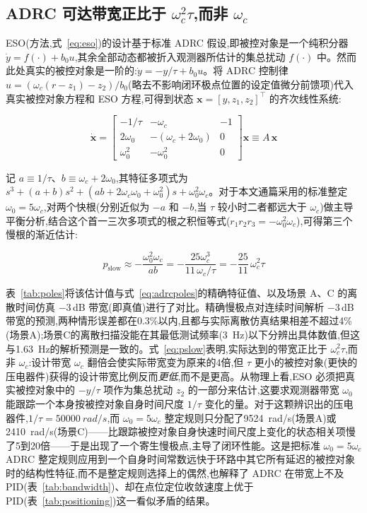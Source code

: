 \documentclass[fleqn,10pt]{wlscirep}
\begin{document}
\subsection*{ADRC 可达带宽正比于 $\omega_c^2\tau$,而非 $\omega_c$}

ESO(方法,式~\ref{eq:eso})的设计基于标准 ADRC 假设,即被控对象是一个纯积分器 $\dot{y} = f(\cdot) + b_0 u$,其余全部动态都被折入观测器所估计的集总扰动 $f(\cdot)$ 中。然而此处真实的被控对象是一阶的:$\dot{y} = -y/\tau + b_0 u$。将 ADRC 控制律 $u = (\omega_c(r-z_1) - z_2)/b_0$(略去不影响闭环极点位置的设定值微分前馈项)代入真实被控对象方程和 ESO 方程,可得到状态 $\mathbf{x} = [y, z_1, z_2]^\top$ 的齐次线性系统:

\begin{equation}
\dot{\mathbf{x}} = \begin{bmatrix} -1/\tau & -\omega_c & -1 \\ 2\omega_0 & -(\omega_c+2\omega_0) & 0 \\ \omega_0^2 & -\omega_0^2 & 0 \end{bmatrix}\mathbf{x} \equiv A\,\mathbf{x}
\label{eq:adrcpoles}
\end{equation}

记 $a \equiv 1/\tau$、$b \equiv \omega_c + 2\omega_0$,其特征多项式为 $s^3 + (a+b)s^2 + (ab+2\omega_c\omega_0+\omega_0^2)s + \omega_0^2\omega_c$。对于本文通篇采用的标准整定 $\omega_0 = 5\omega_c$,对两个快根(分别近似为 $-a$ 和 $-b$,当 $\tau$ 较小时二者都远大于 $\omega_c$)做主导平衡分析,结合这个首一三次多项式的根之积恒等式($r_1 r_2 r_3 = -\omega_0^2\omega_c$),可得第三个慢根的渐近估计:

\begin{equation}
p_\text{slow} \approx -\frac{\omega_0^2\omega_c}{ab} = -\frac{25\omega_c^3}{11\,\omega_c/\tau} = -\frac{25}{11}\,\omega_c^2\tau
\label{eq:pslow}
\end{equation}

表~\ref{tab:poles}将该估计值与式~\ref{eq:adrcpoles}的精确特征值、以及场景 A、C 的离散时间仿真 $-3$\,dB 带宽(即真值)进行了对比。精确慢极点对连续时间解析 $-3$\,dB 带宽的预测,两种情形误差都在0.3\%以内,且都与实际离散仿真结果相差不超过4\%(场景A);场景C的离散扫描没能在其最低测试频率(\SI{3}{Hz})以下分辨出具体数值,但这与\SI{1.63}{Hz}的解析预测是一致的。式~\ref{eq:pslow}表明,实际达到的带宽正比于 $\omega_c^2\tau$,而非 $\omega_c$:设计带宽 $\omega_c$ 翻倍会使实际带宽变为原来的4倍,但 $\tau$ 更小的被控对象(更快的压电器件)获得的设计带宽比例反而\emph{更低},而不是更高。从物理上看,ESO 必须把真实被控对象中的 $-y/\tau$ 项作为集总扰动 $z_2$ 的一部分来估计,这要求观测器带宽 $\omega_0$ 能跟踪一个本身按被控对象自身时间尺度 $1/\tau$ 变化的量。对于这颗辨识出的压电器件,$1/\tau = \SI{50000}{rad/s}$,而 $\omega_0 = 5\omega_c$ 整定规则只分配了\SI{9524}{rad/s}(场景A)或\SI{2410}{rad/s}(场景C)——比跟踪被控对象自身快速时间尺度上变化的状态相关项慢了5到20倍——于是出现了一个寄生慢极点,主导了闭环性能。这是把标准 $\omega_0=5\omega_c$ ADRC 整定规则应用到一个自身时间常数远快于环路中其它所有延迟的被控对象时的结构性特征,而不是整定规则选择上的偶然,也解释了 ADRC 在带宽上不及 PID(表~\ref{tab:bandwidth})、却在点位定位收敛速度上优于 PID(表~\ref{tab:positioning})这一看似矛盾的结果。
\end{document}
